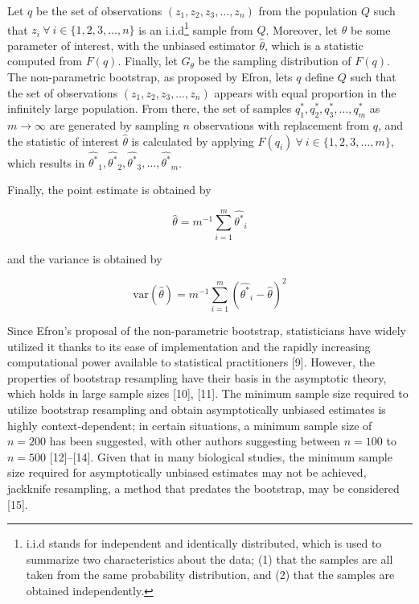 \documentclass[
  letterpaper,
  DIV=11,
  numbers=noendperiod]{scrreprt}
\begin{document}
Let \(q\) be the set of observations
\(\left(z_1, z_2, z_3, \dots, z_n \right)\) from the population \(Q\)
such that \(z_i \ \forall \ i \in \{1, 2, 3, \dots, n\}\) is an
i.i.d\footnote{i.i.d stands for independent and identically distributed,
  which is used to summarize two characteristics about the data; (1)
  that the samples are all taken from the same probability distribution,
  and (2) that the samples are obtained independently.} sample from
\(Q\). Moreover, let \(\theta\) be some parameter of interest, with the
unbiased estimator \(\hat{\theta}\), which is a statistic computed from
\(F(q)\). Finally, let \(G_{\theta}\) be the sampling distribution of
\(F(q)\). The non-parametric bootstrap, as proposed by Efron, lets \(q\)
define \(Q\) such that the set of observations
\(\left(z_1, z_2, z_3, \dots, z_n \right)\) appears with equal
proportion in the infinitely large population. From there, the set of
samples \(q^*_1, q^*_2, q^*_3, \dots, q^*_m\) as
\(m \rightarrow \infty\) are generated by sampling \(n\) observations
with replacement from \(q\), and the statistic of interest
\(\hat{\theta}\) is calculated by applying
\(F(q_i) \ \forall \ i \in \{1, 2, 3, \dots, m\}\), which results in
\(\hat{\theta^*}_1, \hat{\theta^*}_2, \hat{\theta^*}_3, \dots, \hat{\theta^*}_m\).

Finally, the point estimate is obtained by

\[\hat{\theta} = m^{-1}\sum^m_{i = 1} \hat{\theta^*}_i\]

and the variance is obtained by

\[\text{var}(\hat{\theta}) = m^{-1}\sum^m_{i = 1} \left(\hat{\theta^*}_i - \hat{\theta}\right)^2\]

Since Efron's proposal of the non-parametric bootstrap, statisticians
have widely utilized it thanks to its ease of implementation and the
rapidly increasing computational power available to statistical
practitioners {[}9{]}. However, the properties of bootstrap resampling
have their basis in the asymptotic theory, which holds in large sample
sizes {[}10{]}, {[}11{]}. The minimum sample size required to utilize
bootstrap resampling and obtain asymptotically unbiased estimates is
highly context-dependent; in certain situations, a minimum sample size
of \(n = 200\) has been suggested, with other authors suggesting between
\(n = 100\) to \(n = 500\) {[}12{]}--{[}14{]}. Given that in many
biological studies, the minimum sample size required for asymptotically
unbiased estimates may not be achieved, jackknife resampling, a method
that predates the bootstrap, may be considered {[}15{]}.
\end{document}
